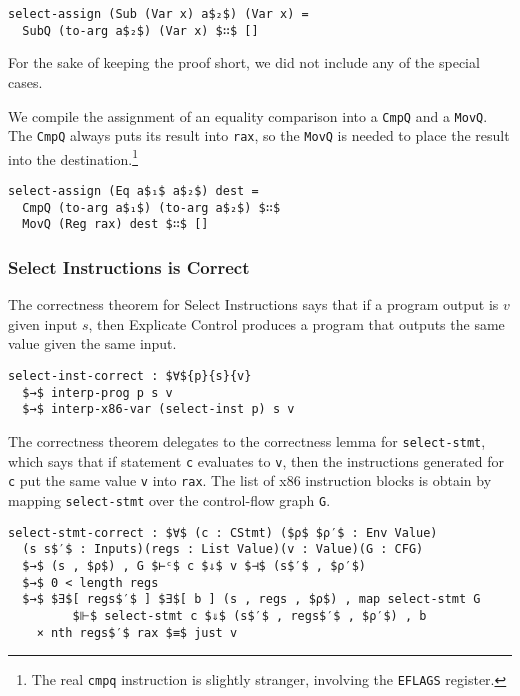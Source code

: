 \documentclass[sigplan,review,dvipsnames,screen,10pt]{acmart}
\begin{document}
\begin{lstlisting}
select-assign (Sub (Var x) a$₂$) (Var x) = 
  SubQ (to-arg a$₂$) (Var x) $∷$ []
\end{lstlisting}

\noindent For the sake of keeping the proof short, we did not include
any of the special cases.

We compile the assignment of an equality comparison into a
\lstinline{CmpQ} and a \lstinline{MovQ}. The \lstinline{CmpQ} always
puts its result into \lstinline{rax}, so the \lstinline{MovQ} is
needed to place the result into the destination.\footnote{The real
\lstinline{cmpq} instruction is slightly stranger, involving
the \lstinline{EFLAGS} register.}

\begin{lstlisting}
select-assign (Eq a$₁$ a$₂$) dest =
  CmpQ (to-arg a$₁$) (to-arg a$₂$) $∷$
  MovQ (Reg rax) dest $∷$ []
\end{lstlisting}


\subsubsection{Select Instructions is Correct}

The correctness theorem for Select Instructions says that if a program
output is $v$ given input $s$, then Explicate Control produces a
program that outputs the same value given the same input.

\begin{lstlisting}
select-inst-correct : $∀${p}{s}{v}
  $→$ interp-prog p s v
  $→$ interp-x86-var (select-inst p) s v
\end{lstlisting}

The correctness theorem delegates to the correctness lemma for
\lstinline{select-stmt}, which says that if statement \lstinline{c}
evaluates to \lstinline{v}, then the instructions generated for
\lstinline{c} put the same value \lstinline{v} into \lstinline{rax}.
The list of x86 instruction blocks is obtain by mapping
\lstinline{select-stmt} over the control-flow graph \lstinline{G}.

\begin{lstlisting}
select-stmt-correct : $∀$ (c : CStmt) ($ρ$ $ρ′$ : Env Value)
  (s s$′$ : Inputs)(regs : List Value)(v : Value)(G : CFG)
  $→$ (s , $ρ$) , G $⊢ᶜ$ c $⇓$ v $⊣$ (s$′$ , $ρ′$)
  $→$ 0 < length regs
  $→$ $∃$[ regs$′$ ] $∃$[ b ] (s , regs , $ρ$) , map select-stmt G
         $⊩$ select-stmt c $⇓$ (s$′$ , regs$′$ , $ρ′$) , b
    × nth regs$′$ rax $≡$ just v
\end{lstlisting}
\end{document}
